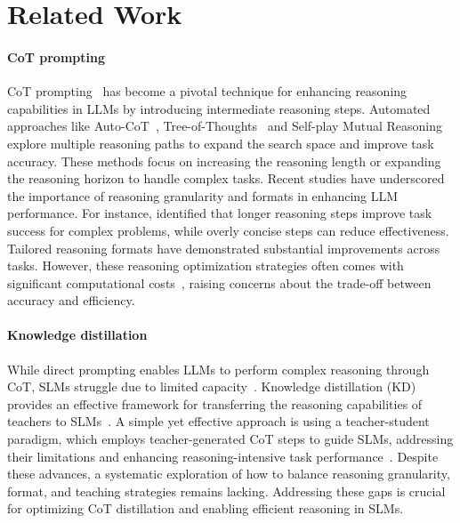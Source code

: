 \section{Related Work}
\paragraph{CoT prompting} CoT prompting~\cite{wei2023chainofthoughtpromptingelicitsreasoning} has become a pivotal technique for enhancing reasoning capabilities in LLMs by introducing intermediate reasoning steps. Automated approaches like Auto-CoT~\cite{zhang2023automatic}, Tree-of-Thoughts~\cite{yao2023tree} and Self-play Mutual Reasoning~\cite{qi2024mutualreasoningmakessmaller} explore multiple reasoning paths to expand the search space and improve task accuracy. These methods focus on increasing the reasoning length or expanding the reasoning horizon to handle complex tasks. 
Recent studies have underscored the importance of reasoning granularity and formats in enhancing LLM performance. For instance, \citet{jin-etal-2024-impact} identified that longer reasoning steps improve task success for complex problems, while overly concise steps can reduce effectiveness. Tailored reasoning formats\cite{DBLP:conf/iclr/KhotTFF0CS23, zhou2023leasttomost, deng2024rephraserespondletlarge, xu2024faithfullogicalreasoningsymbolic} have demonstrated substantial improvements across tasks. However, these reasoning optimization strategies often comes with significant computational costs~\cite{nayab2024concisethoughtsimpactoutput}, raising concerns about the trade-off between accuracy and efficiency. 

\paragraph{Knowledge distillation} While direct prompting enables LLMs to perform complex reasoning through CoT, SLMs struggle due to limited capacity~\cite{stolfo-etal-2023-causal}. Knowledge distillation (KD) provides an effective framework for transferring the reasoning capabilities of teachers to SLMs~\cite{xu2024surveyknowledgedistillationlarge}. A simple yet effective approach is using a teacher-student paradigm, which employs teacher-generated CoT steps to guide SLMs, addressing their limitations and enhancing reasoning-intensive task performance~\cite{magister-etal-2023-teaching, ho-etal-2023-large, shridhar-etal-2023-distilling}. 
Despite these advances, a systematic exploration of how to balance reasoning granularity, format, and teaching strategies remains lacking. Addressing these gaps is crucial for optimizing CoT distillation and enabling efficient reasoning in SLMs.